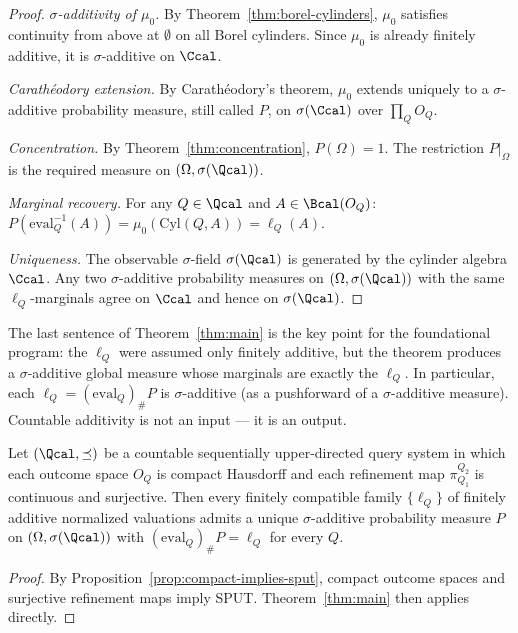 \begin{proof}
\emph{$\sigma$-additivity of $\mu_0$.}
By Theorem~\ref{thm:borel-cylinders}, $\mu_0$ satisfies continuity
from above at $\emptyset$ on all Borel cylinders.  Since $\mu_0$ is
already finitely additive, it is $\sigma$-additive on $\Ccal$.

\emph{Carath\'eodory extension.}
By Carath\'eodory's theorem, $\mu_0$ extends uniquely to a
$\sigma$-additive probability measure, still called $P$, on
$\sigma(\Ccal)$ over $\prod_Q O_Q$.

\emph{Concentration.}
By Theorem~\ref{thm:concentration}, $P(\Omega) = 1$.  The
restriction $P|_\Omega$ is the required measure on
$(\Omega, \sigma(\Qcal))$.

\emph{Marginal recovery.}
For any $Q \in \Qcal$ and $A \in \Bcal(O_Q)$:
$P(\mathrm{eval}_Q^{-1}(A)) = \mu_0(\mathrm{Cyl}(Q,A)) = \ell_Q(A)$.

\emph{Uniqueness.}
The observable $\sigma$-field $\sigma(\Qcal)$ is generated by the
cylinder algebra $\Ccal$.  Any two $\sigma$-additive probability
measures on $(\Omega, \sigma(\Qcal))$ with the same $\ell_Q$-marginals
agree on $\Ccal$ and hence on $\sigma(\Qcal)$.
\end{proof}

\begin{remark}
The last sentence of Theorem~\ref{thm:main} is the key point for
the foundational program: the $\ell_Q$ were assumed only finitely
additive, but the theorem produces a $\sigma$-additive global
measure whose marginals are exactly the $\ell_Q$.  In particular,
each $\ell_Q = (\mathrm{eval}_Q)_\# P$ is $\sigma$-additive (as
a pushforward of a $\sigma$-additive measure).  Countable additivity
is not an input --- it is an output.
\end{remark}

\begin{corollary}
\label{cor:architectural}
Let $(\Qcal, \preceq)$ be a countable sequentially upper-directed
query system in which each outcome space $O_Q$ is compact Hausdorff
and each refinement map $\pi^{Q_2}_{Q_1}$ is continuous and
surjective.  Then every finitely compatible family $\{\ell_Q\}$ of
finitely additive normalized valuations admits a unique
$\sigma$-additive probability measure $P$ on $(\Omega,\sigma(\Qcal))$
with $(\mathrm{eval}_Q)_\# P = \ell_Q$ for every $Q$.
\end{corollary}

\begin{proof}
By Proposition~\ref{prop:compact-implies-sput}, compact outcome
spaces and surjective refinement maps imply SPUT.
Theorem~\ref{thm:main} then applies directly.
\end{proof}

